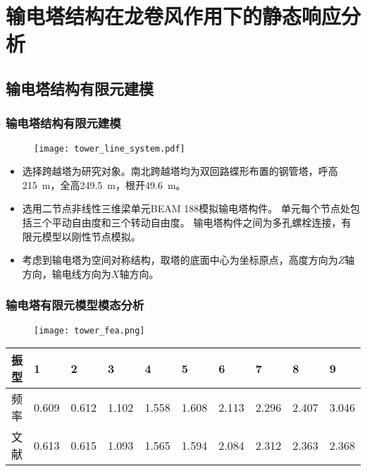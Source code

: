 \section{输电塔结构在龙卷风作用下的静态响应分析}
\subsection{输电塔结构有限元建模}

\begin{frame}
  \frametitle{输电塔结构有限元建模}
  
  \begin{figure}[!htbp]
  	\centering
    \texttt{[image: tower\_line\_system.pdf]}
    \label{fig:tower-line}
  \end{figure}

  \begin{itemize}
  \item
    选择跨越塔为研究对象。南北跨越塔均为双回路蝶形布置的钢管塔，呼高\SI{215}{m}，全高\SI{249.5}{m}，根开\SI{49.6}{m}。
  \item 
    选用二节点非线性三维梁单元BEAM 188模拟输电塔构件。
    单元每个节点处包括三个平动自由度和三个转动自由度。
    输电塔构件之间为多孔螺栓连接，有限元模型以刚性节点模拟。
  \item
   考虑到输电塔为空间对称结构，取塔的底面中心为坐标原点，高度方向为$Z$轴方向，输电线方向为$X$轴方向。
  \end{itemize}

\end{frame}

\begin{frame}
  \frametitle{输电塔有限元模型模态分析}
  
  \begin{figure}[!htbp]
    \centering
    \texttt{[image: tower\_fea.png]}
    \label{fig:tower-fea}
  \end{figure}

  \begin{table}[!htbp]
	\centering
	\label{tab:freq}
	\begin{tabu} to 1.0\textwidth {X[1.5,c] X[1,c] X[1,c] X[1,c] X[1,c] X[1,c] X[1,c] X[1,c] X[1,c] X[1,c]}
		\toprule
		振型 & 1     & 2     & 3     & 4     & 5     & 6     & 7     & 8     & 9     \\
		\midrule
		频率 & 0.609 & 0.612 & 1.102 & 1.558 & 1.608 & 2.113 & 2.296 & 2.407 & 3.046 \\
    文献 & 0.613 & 0.615 & 1.093 & 1.565 & 1.594 & 2.084 & 2.312 & 2.363 & 2.368 \\
		\bottomrule
	\end{tabu}
\end{table}

\end{frame}

